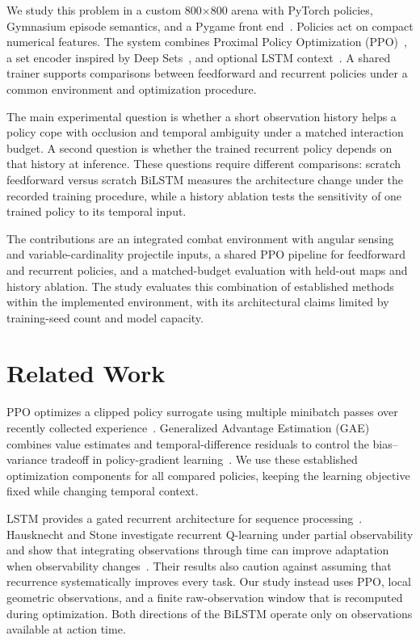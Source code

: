 \documentclass[conference]{IEEEtran}
\begin{document}
We study this problem in a custom 800$\times$800 arena with PyTorch policies, Gymnasium episode semantics, and a Pygame front end~\cite{repository}. Policies act on compact numerical features. The system combines Proximal Policy Optimization (PPO)~\cite{ppo}, a set encoder inspired by Deep Sets~\cite{deepsets}, and optional LSTM context~\cite{lstm}. A shared trainer supports comparisons between feedforward and recurrent policies under a common environment and optimization procedure.

The main experimental question is whether a short observation history helps a policy cope with occlusion and temporal ambiguity under a matched interaction budget. A second question is whether the trained recurrent policy depends on that history at inference. These questions require different comparisons: scratch feedforward versus scratch BiLSTM measures the architecture change under the recorded training procedure, while a history ablation tests the sensitivity of one trained policy to its temporal input.

The contributions are an integrated combat environment with angular sensing and variable-cardinality projectile inputs, a shared PPO pipeline for feedforward and recurrent policies, and a matched-budget evaluation with held-out maps and history ablation. The study evaluates this combination of established methods within the implemented environment, with its architectural claims limited by training-seed count and model capacity.

\section{Related Work}
PPO optimizes a clipped policy surrogate using multiple minibatch passes over recently collected experience~\cite{ppo}. Generalized Advantage Estimation (GAE) combines value estimates and temporal-difference residuals to control the bias--variance tradeoff in policy-gradient learning~\cite{gae}. We use these established optimization components for all compared policies, keeping the learning objective fixed while changing temporal context.

LSTM provides a gated recurrent architecture for sequence processing~\cite{lstm}. Hausknecht and Stone investigate recurrent Q-learning under partial observability and show that integrating observations through time can improve adaptation when observability changes~\cite{drqn}. Their results also caution against assuming that recurrence systematically improves every task. Our study instead uses PPO, local geometric observations, and a finite raw-observation window that is recomputed during optimization. Both directions of the BiLSTM operate only on observations available at action time.
\end{document}
